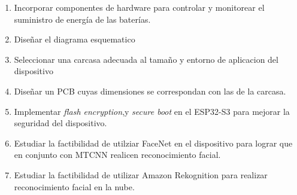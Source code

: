\begin{enumerate}
	\item Incorporar componentes de hardware para controlar y monitorear el suministro de energía de las baterías.
	\item Diseñar el diagrama esquematico
	\item Seleccionar una carcasa adecuada al tamaño y entorno de aplicacion del dispositivo
	\item Diseñar un PCB cuyas dimensiones se correspondan con las de la carcasa.
	\item Implementar \textit{flash encryption},y \textit{secure boot} en el ESP32-S3 para mejorar la seguridad del dispositivo.
	\item Estudiar la factibilidad de utilziar FaceNet en el dispositivo para lograr que en conjunto con MTCNN realicen reconocimiento facial.
	\item Estudiar la factibilidad de utilizar Amazon Rekognition para realizar reconocimiento facial en la nube.
\end{enumerate}
